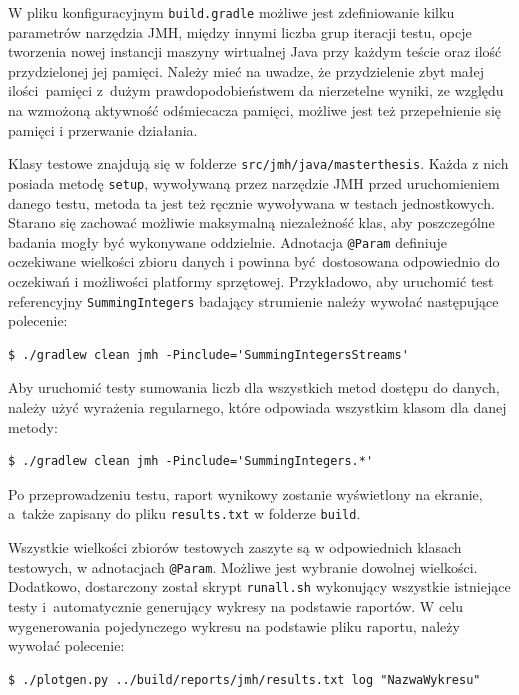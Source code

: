 \documentclass[12pt,twoside,openright]{extarticle}
\begin{document}
    W pliku konfiguracyjnym \texttt{build.gradle} możliwe jest zdefiniowanie kilku parametrów narzędzia JMH, między innymi liczba grup iteracji testu, opcje tworzenia nowej instancji maszyny wirtualnej Java przy każdym teście oraz ilość przydzielonej jej pamięci. Należy mieć na uwadze, że przydzielenie zbyt małej ilości pamięci z~dużym prawdopodobieństwem da nierzetelne wyniki, ze względu na wzmożoną aktywność odśmiecacza pamięci, możliwe jest też przepełnienie się pamięci i przerwanie działania. 

    Klasy testowe znajdują się w folderze \texttt{src/jmh/java/masterthesis}. Każda z nich posiada metodę \texttt{setup}, wywoływaną przez narzędzie JMH przed uruchomieniem danego testu, metoda ta jest też ręcznie wywoływana w testach jednostkowych. Starano się zachować możliwie maksymalną niezależność klas, aby poszczególne badania mogły być wykonywane oddzielnie. Adnotacja \texttt{@Param} definiuje oczekiwane wielkości zbioru danych i powinna być dostosowana odpowiednio do oczekiwań i możliwości platformy sprzętowej. Przykładowo, aby uruchomić test referencyjny \texttt{SummingIntegers} badający strumienie należy wywołać następujące polecenie:

\begin{verbatim}
$ ./gradlew clean jmh -Pinclude='SummingIntegersStreams'
\end{verbatim}

    Aby uruchomić testy sumowania liczb dla wszystkich metod dostępu do danych, należy użyć wyrażenia regularnego, które odpowiada wszystkim klasom dla danej metody:

\begin{verbatim}
$ ./gradlew clean jmh -Pinclude='SummingIntegers.*'
\end{verbatim}

    Po przeprowadzeniu testu, raport wynikowy zostanie wyświetlony na ekranie, a~także zapisany do pliku \texttt{results.txt} w folderze \texttt{build}.

    Wszystkie wielkości zbiorów testowych zaszyte są w odpowiednich klasach testowych, w adnotacjach \texttt{@Param}. Możliwe jest wybranie dowolnej wielkości. Dodatkowo, dostarczony został skrypt \texttt{runall.sh} wykonujący wszystkie istniejące testy i~automatycznie generujący wykresy na podstawie raportów. W celu wygenerowania pojedynczego wykresu na podstawie pliku raportu, należy wywołać polecenie:

\begin{verbatim}
$ ./plotgen.py ../build/reports/jmh/results.txt log "NazwaWykresu"
\end{verbatim}

\clearpage \mbox{} \clearpage
\clearpage \mbox{} \clearpage
\clearpage \mbox{} \clearpage
\clearpage \mbox{} \clearpage
\end{document}
